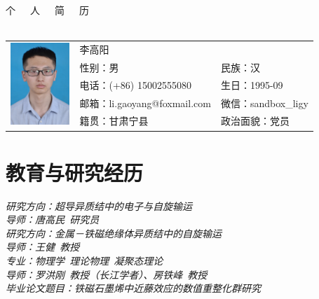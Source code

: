 \documentclass{resume}
\begin{document}

\begin{center}
\Huge{个~~~人~~~简~~~历}
\ \\ \ 
\end{center}
\Large{
  \begin{tabu}{ c l l }
    &
   \scshape{李高阳} &  \\
    & 性别：男 & 民族：汉 \\
    & 电话：(+86) 15002555080 & 生日：1995-09 \\
    & 邮箱：li.gaoyang@foxmail.com & 微信：sandbox\_ligy\\
    & 籍贯：甘肃宁县 & 政治面貌：党员
  \end{tabu}
}

\large
\section{教育与研究经历}
\textit{研究方向：超导异质结中的电子与自旋输运}\\
\textit{导师：唐高民\ 研究员}\\

\textit{研究方向：金属－铁磁绝缘体异质结中的自旋输运}\\
\textit{导师：王健\ 教授}\\

\textit{专业：物理学\ 理论物理\ 凝聚态理论}\\
\textit{导师：罗洪刚\ 教授（长江学者）、房铁峰\ 教授}\\
\textit{毕业论文题目：铁磁石墨烯中近藤效应的数值重整化群研究}\\
\end{document}
